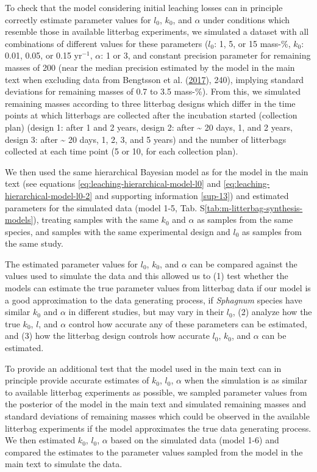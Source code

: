 \documentclass[
  12pt,
]{article}
\begin{document}
To check that the model considering initial leaching losses can in principle correctly estimate parameter values for \(l_0\), \(k_0\), and \(\alpha\) under conditions which resemble those in available litterbag experiments, we simulated a dataset with all combinations of different values for these parameters (\(l_0\): 1, 5, or 15 mass-\%, \(k_0\): 0.01, 0.05, or 0.15 yr\(^{-1}\), \(\alpha\): 1 or 3, and constant precision parameter for remaining masses of 200 (near the median precision estimated by the model in the main text when excluding data from Bengtsson et al. (\protect\hyperlink{ref-Bengtsson.2017}{2017}), 240), implying standard deviations for remaining masses of 0.7 to 3.5 mass-\%). From this, we simulated remaining masses according to three litterbag designs which differ in the time points at which litterbags are collected after the incubation started (collection plan) (design 1: after 1 and 2 years, design 2: after \textasciitilde{} 20 days, 1, and 2 years, design 3: after \textasciitilde{} 20 days, 1, 2, 3, and 5 years) and the number of litterbags collected at each time point (5 or 10, for each collection plan).

We then used the same hierarchical Bayesian model as for the model in the main text (see equations \eqref{eq:leaching-hierarchical-model-l0} and \eqref{eq:leaching-hierarchical-model-l0-2} and supporting information \ref{sup-13}) and estimated parameters for the simulated data (model 1-5, Tab. S\ref{tab:m-litterbag-synthesis-models}), treating samples with the same \(k_0\) and \(\alpha\) as samples from the same species, and samples with the same experimental design and \(l_0\) as samples from the same study.

The estimated parameter values for \(l_0\), \(k_0\), and \(\alpha\) can be compared against the values used to simulate the data and this allowed us to (1) test whether the models can estimate the true parameter values from litterbag data if our model is a good approximation to the data generating process, if \emph{Sphagnum} species have similar \(k_0\) and \(\alpha\) in different studies, but may vary in their \(l_0\), (2) analyze how the true \(k_0\), \(l\), and \(\alpha\) control how accurate any of these parameters can be estimated, and (3) how the litterbag design controls how accurate \(l_0\), \(k_0\), and \(\alpha\) can be estimated.

To provide an additional test that the model used in the main text can in principle provide accurate estimates of \(k_0\), \(l_0\), \(\alpha\) when the simulation is as similar to available litterbag experiments as possible, we sampled parameter values from the posterior of the model in the main text and simulated remaining masses and standard deviations of remaining masses which could be observed in the available litterbag experiments if the model approximates the true data generating process. We then estimated \(k_0\), \(l_0\), \(\alpha\) based on the simulated data (model 1-6) and compared the estimates to the parameter values sampled from the model in the main text to simulate the data.
\end{document}
